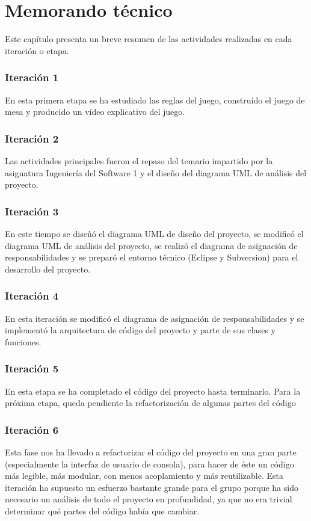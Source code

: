 \documentclass[11 pt]{book}
\begin{document}
\chapter{Memorando técnico}
	Este capítulo presenta un breve resumen de las actividades realizadas en cada iteración o etapa.
	
	\subsection*{Iteración 1}
		En esta primera etapa se ha estudiado las reglas del juego, construído el juego de mesa y producido un vídeo explicativo del juego.
		
	\subsection*{Iteración 2}
		Las actividades principales fueron el repaso del temario impartido por la asignatura Ingeniería del Software 1 y el diseño del diagrama UML de análisis del proyecto.
		
	\subsection*{Iteración 3}
		En este tiempo se diseñó el diagrama UML de diseño del proyecto, se modificó el diagrama UML de análisis del proyecto, se realizó el diagrama de asignación de responsabilidades y se preparó el entorno técnico (Eclipse y Subversion) para el desarrollo del proyecto.
		
	\subsection*{Iteración 4}
		En esta iteración se modificó el diagrama de asignación de responsabilidades y se implementó la arquitectura de código del proyecto y parte de sus clases y funciones.
	
	\subsection*{Iteración 5}
		En esta etapa se ha completado el código del proyecto hasta terminarlo. Para la próxima etapa, queda pendiente la refactorización de algunas partes del código
		
	\subsection*{Iteración 6}
		Esta fase nos ha llevado a refactorizar el código del proyecto en una gran parte (especialmente la interfaz de usuario de consola), para hacer de éste un código más legible, más modular, con menos acoplamiento y más reutilizable. Esta iteración ha supuesto un esfuerzo bastante grande para el grupo porque ha sido necesario un análisis de todo el proyecto en profundidad, ya que no era trivial determinar qué partes del código había que cambiar.
		
\end{document}
